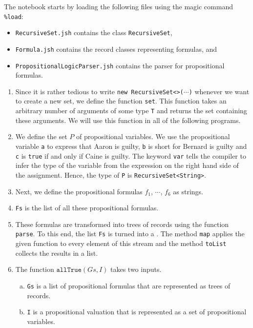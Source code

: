 \noindent
The notebook starts by loading the following files using the magic command \texttt{\%load}:
\begin{itemize}
\item \texttt{RecursiveSet.jsh} contains the class \texttt{RecursiveSet},
\item \texttt{Formula.jsh} contains the record classes representing formulas, and
\item \texttt{PropositionalLogicParser.jsh} contains the parser for propositional formulas.
\end{itemize}
\begin{enumerate}
\item Since it is rather tedious to write \texttt{new RecursiveSet<>($\cdots$)} whenever we want to create a new
      set, we define the function \texttt{set}.  This function takes an arbitrary number of arguments of
      some type \texttt{T} and returns the set containing these arguments.  We will use this function in all of
      the following programs.
\item We define the set $P$ of propositional variables.  We use the propositional variable \texttt{a} to
      express that Aaron is guilty, \texttt{b} is short for Bernard is guilty and \texttt{c} is \texttt{true} if and
      only if Caine is guilty.  The keyword \texttt{var} tells the compiler to infer the type of the variable
      from the expression on the right hand side of the assignment.  Hence, the type of \texttt{P} is 
      \texttt{RecursiveSet<String>}.
\item Next, we define the propositional formulas $f_1$, $\cdots$, $f_6$ as strings.
\item \texttt{Fs} is the list of all these propositional formulas.
\item These formulas are transformed into trees of records using the function \texttt{parse}.  To this end, the
      list \texttt{Fs} is turned into a .  The method \texttt{map} applies the given function to
      every element of this stream and the method \texttt{toList} collects the results in a list.
\item The function $\texttt{allTrue}(Gs, I)$ takes two inputs.
      \begin{enumerate}[(a)]
      \item \texttt{Gs} is a list of propositional formulas that are represented as trees of records.
      \item \texttt{I} is a propositional valuation that is represented as a set of propositional variables.

\end{enumerate}
\end{enumerate}

